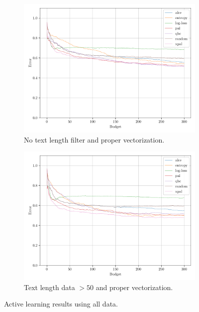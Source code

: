 \begin{figure}[ht]
    \centering
    \begin{subfigure}{0.49\textwidth}
        \includegraphics[width=\textwidth]{../img/plot_text_data_all_proper_vectorizer_test_results.pdf}
        \caption{No text length filter and proper vectorization.}
        \label{fig:probal_all_proper_vect}
    \end{subfigure}
    \hfill
    \begin{subfigure}{0.49\textwidth}
        \includegraphics[width=\textwidth]{../img/plot_text_data_all_proper_vectorizer_50_st_filter_test_results.pdf}
        \caption{Text length data $>50$ and proper vectorization.}
        \label{fig:probal_all_proper_vect_50_st_filter}
    \end{subfigure}
    \caption{Active learning results using all data.}
\end{figure}

